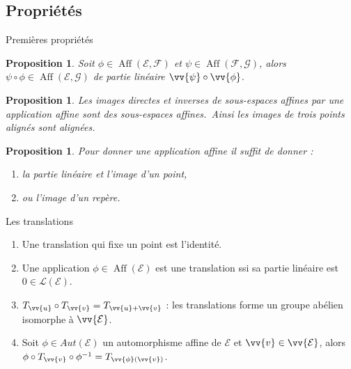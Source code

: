 \documentclass[aspectratio=1610 %
]{beamer}
\newtheorem{proposition}[theorem]{Proposition}
\DeclareMathOperator{\Aff}{Aff}
\begin{document}
\subsection{Propriétés}
  \begin{frame}{Premières propriétés}
    \begin{proposition}
      Soit $\phi\in\Aff(\mathcal{E},\mathcal{F})$ et $\psi\in\Aff(\mathcal{F},\mathcal{G})$, alors $\psi\circ\phi\in\Aff(\mathcal{E},\mathcal{G})$ de partie linéaire $\vv{\psi}\circ\vv{\phi}$.
    \end{proposition}\pause
    \begin{proposition}
      Les images directes et inverses de sous-espaces affines par une application affine sont des sous-espaces affines.\pause\ Ainsi les images de trois points alignés sont alignées.
    \end{proposition}\pause
    \begin{proposition}
      Pour donner une application affine il suffit de donner :
      \begin{enumerate}[<+(1)->]
        \item la partie linéaire et l'image d'un point,
        \item ou l'image d'un repère.
      \end{enumerate}
    \end{proposition}
  \end{frame}
  \begin{frame}{Les translations}
    \begin{enumerate}[<+(1)->]
      \item Une translation qui fixe un point est l'identité.
      \item Une application $\phi\in\Aff(\mathcal{E})$ est une translation ssi sa partie linéaire est $0 \in \mathcal{L}(\mathcal{E})$.
      \item $T_{\vv{u}}\circ T_{\vv{v}} = T_{\vv{u}+\vv{v}}$ : les translations forme un groupe abélien isomorphe à $\vv{\mathcal{E}}$.
      \item Soit $\phi \in Aut(\mathcal{E})$ un automorphisme affine de $\mathcal{E}$ et $\vv{v} \in \vv{\mathcal{E}}$, alors $\phi\circ T_{\vv{v}}\circ\phi^{-1}=T_{\vv{\phi}(\vv{v})}$.
    \end{enumerate}
  \end{frame}
\end{document}
